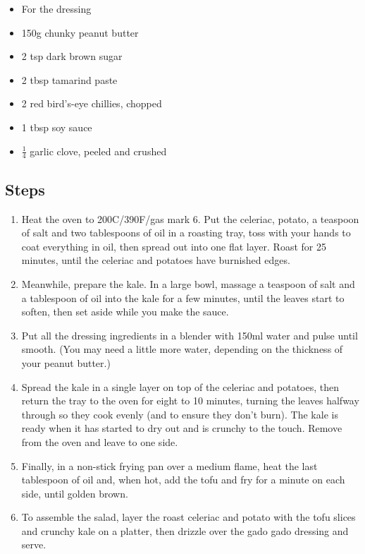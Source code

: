 \documentclass{book}
\begin{document}
\begin{itemize}
\item For the dressing
\item 150g chunky peanut butter
\item 2 tsp dark brown sugar
\item 2 tbsp tamarind paste
\item 2 red bird’s-eye chillies, chopped
\item 1 tbsp soy sauce
\item $\frac{1}{4}$ garlic clove, peeled and crushed
\end{itemize}

\subsection*{Steps}
\begin{enumerate}
\item Heat the oven to 200C/390F/gas mark 6. Put the celeriac, potato, a teaspoon of salt and two tablespoons of oil in a roasting tray, toss with your hands to coat everything in oil, then spread out into one flat layer. Roast for 25 minutes, until the celeriac and potatoes have burnished edges.
\item Meanwhile, prepare the kale. In a large bowl, massage a teaspoon of salt and a tablespoon of oil into the kale for a few minutes, until the leaves start to soften, then set aside while you make the sauce.
\item Put all the dressing ingredients in a blender with 150ml water and pulse until smooth. (You may need a little more water, depending on the thickness of your peanut butter.)
\item Spread the kale in a single layer on top of the celeriac and potatoes, then return the tray to the oven for eight to 10 minutes, turning the leaves halfway through so they cook evenly (and to ensure they don’t burn). The kale is ready when it has started to dry out and is crunchy to the touch. Remove from the oven and leave to one side.
\item Finally, in a non-stick frying pan over a medium flame, heat the last tablespoon of oil and, when hot, add the tofu and fry for a minute on each side, until golden brown.
\item To assemble the salad, layer the roast celeriac and potato with the tofu slices and crunchy kale on a platter, then drizzle over the gado gado dressing and serve.
\end{enumerate}
\newpage
\end{document}
